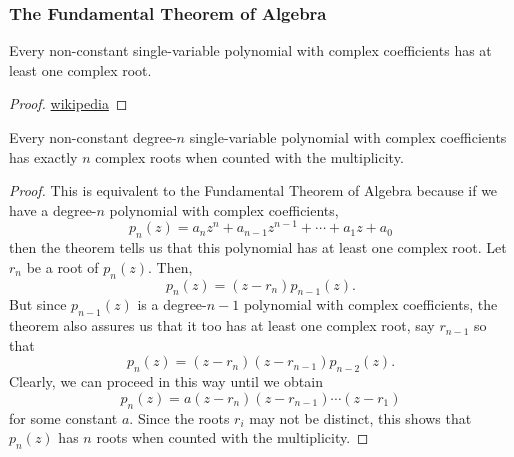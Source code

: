 \documentclass[../MathsNotesBase.tex]{subfiles}
\begin{document}
{		\subsubsection{The Fundamental Theorem of Algebra}
		\begin{theorem}\label{theo:fundamental-theorem-of-algebra}
			Every non-constant single-variable polynomial with complex coefficients has at least one complex root.
		\end{theorem}
		\begin{proof}
			\href{https://en.wikipedia.org/wiki/Fundamental_theorem_of_algebra\#Proofs}{wikipedia}
		\end{proof}
		\begin{corollary}
			Every non-constant degree-$n$ single-variable polynomial with complex coefficients has exactly $n$ complex roots when counted with the multiplicity.
		\end{corollary}
		\begin{proof}
			This is equivalent to the Fundamental Theorem of Algebra because if we have a degree-$n$ polynomial with complex coefficients,
			\[ p_n(z) = a_n z^n + a_{n-1} z^{n-1} + \cdots + a_1 z + a_0 \]
			then the theorem tells us that this polynomial has at least one complex root. Let $r_n$ be a root of $p_n(z)$. Then,
			\[ p_n(z) = (z - r_n)p_{n-1}(z). \]
			But since $p_{n-1}(z)$ is a degree-$n-1$ polynomial with complex coefficients, the theorem also assures us that it too has at least one complex root, say $r_{n-1}$ so that
			\[ p_n(z) = (z - r_n)(z - r_{n-1})p_{n-2}(z). \]
			Clearly, we can proceed in this way until we obtain
			\[ p_n(z) = a(z - r_n)(z - r_{n-1})\cdots(z - r_1) \]
			for some constant $a$. Since the roots $r_i$ may not be distinct, this shows that $p_n(z)$ has $n$ roots when counted with the multiplicity.
		\end{proof}
	
		\biggerskip
}
\end{document}
